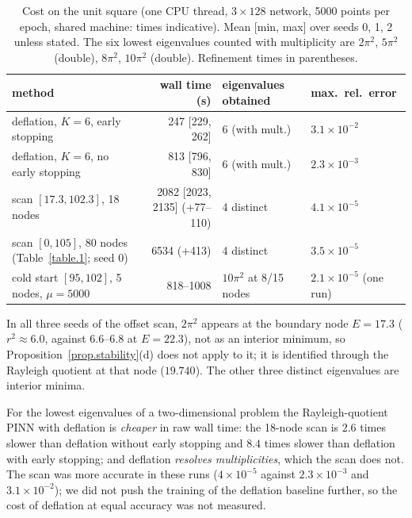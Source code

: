 \documentclass[10pt]{amsart}
\newenvironment{revblock}{\color{blue}}{}
\theoremstyle{definition}
\theoremstyle{remark}
\theoremstyle{plain}
\begin{document}
\begin{revblock}
\begin{table}[tbp]
\centering\small
\color{blue}
\caption{Cost on the unit square (one CPU thread, $3\times128$ network, 5000 points per epoch, shared machine: times indicative). Mean [min, max] over seeds 0, 1, 2 unless stated. The six lowest eigenvalues counted with multiplicity are $2\pi^2$, $5\pi^2$ (double), $8\pi^2$, $10\pi^2$ (double). Refinement times in parentheses.}
\label{table.cost}
\begin{tabular}{lrll}
\toprule
method & wall time (s) & eigenvalues obtained & max.\ rel.\ error\\
\midrule
deflation, $K=6$, early stopping & 247 [229, 262] & 6 (with mult.) & $3.1\times10^{-2}$\\
deflation, $K=6$, no early stopping & 813 [796, 830] & 6 (with mult.) & $2.3\times10^{-3}$\\
scan $[17.3,102.3]$, 18 nodes & 2082 [2023, 2135] (+77--110) & 4 distinct & $4.1\times10^{-5}$\\
scan $[0,105]$, 80 nodes (Table~\ref{table.1}; seed 0) & 6534 (+413) & 4 distinct & $3.5\times10^{-5}$\\
cold start $[95,102]$, 5 nodes, $\mu=5000$ & 818--1008 & $10\pi^2$ at 8/15 nodes & $2.1\times10^{-5}$ (one run)\\
\bottomrule
\end{tabular}
\end{table}

In all three seeds of the offset scan, $2\pi^2$ appears at the boundary node $E=17.3$ ($r^2\approx6.0$,
against $6.6$--$6.8$ at $E=22.3$), not as an interior minimum, so Proposition~\ref{prop.stability}(d)
does not apply to it; it is identified through the Rayleigh quotient at that node ($19.740$). The other
three distinct eigenvalues are interior minima.

For the lowest eigenvalues of a two-dimensional problem the Rayleigh-quotient PINN with deflation is
\emph{cheaper} in raw wall time: the 18-node scan is $2.6$ times slower than deflation without early
stopping and $8.4$ times slower than deflation with early stopping; and deflation \emph{resolves
multiplicities}, which the scan does not. The scan was more accurate in these runs ($4\times10^{-5}$
against $2.3\times10^{-3}$ and $3.1\times10^{-2}$); we did not push the training of the deflation
baseline further, so the cost of deflation at equal accuracy was not measured.


\end{revblock}
\end{document}

